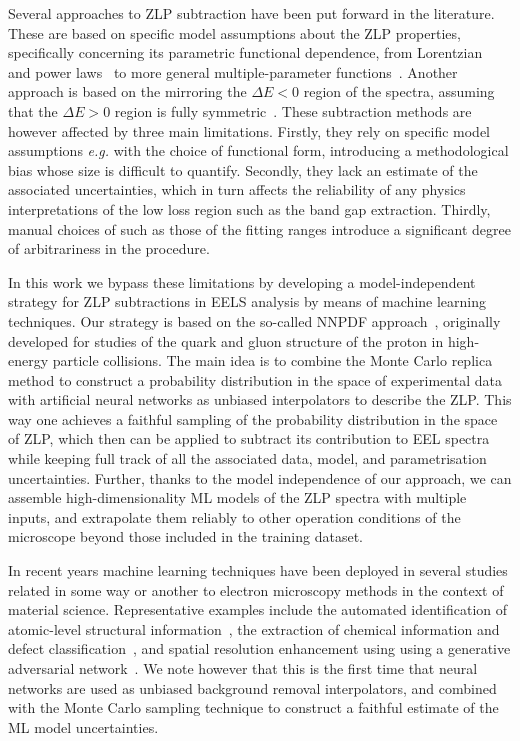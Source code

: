 Several approaches to ZLP subtraction have been put forward in the literature.
%
These are based on specific model assumptions about the ZLP properties, specifically
concerning its parametric functional dependence, from Lorentzian~\cite{Dorneich:1998}
and power laws~\cite{Erni:2005} to more general multiple-parameter functions~\cite{Benthem:2001}.
%
Another approach is based on the mirroring the $\Delta E <0$ region of the spectra, assuming
that the $\Delta E>0$ region is fully symmetric~\cite{Lazar:2003}.
%
These  subtraction methods are however affected by three main limitations.
%
Firstly, they rely on specific model assumptions {\it e.g.} with
the choice of functional form, introducing a methodological
bias whose size is difficult to quantify.
%
Secondly, they lack an estimate of the associated uncertainties, which in turn affects
the reliability of any physics interpretations of the low loss region such as the band gap extraction.
%
Thirdly, manual choices of such as those of the fitting ranges introduce a significant degree of
arbitrariness in the procedure.

In this work we bypass these limitations by developing a model-independent strategy
for ZLP subtractions in EELS analysis by means of machine learning techniques.
%
Our strategy is based on the so-called NNPDF approach~\cite{Ball:2008by,Ball:2012cx,Ball:2014uwa,Ball:2017nwa}, originally
developed for studies
of the quark and gluon structure of the proton in high-energy particle collisions.
%
The main idea is to combine the  Monte Carlo replica  method to construct a probability
distribution in the space of experimental data with artificial
neural networks as unbiased interpolators to describe the ZLP.
%
This way one achieves
a faithful sampling of the probability distribution in the space of ZLP,
which then can be applied to subtract its contribution to EEL spectra while keeping
full track of all the associated
data, model, and parametrisation uncertainties.
%
Further, thanks to the model independence
of our approach, we can assemble high-dimensionality ML models
of the ZLP spectra with multiple inputs, and extrapolate them reliably
to other operation conditions of the microscope beyond those included
in the training dataset.

In recent years
machine learning techniques have been deployed in several studies
related in some way or another to electron microscopy methods
in the context of material science.
%
Representative examples
include the automated identification
of atomic-level structural information~\cite{10.1145/2834892.2834896},
the extraction of chemical information
and defect classification~\cite{doi:10.1021/acsnano.7b07504},
and spatial resolution enhancement
using  using a generative adversarial network~\cite{cite-key}.
%
We note however that this is the first
time that neural networks are used as 
 unbiased
background removal interpolators, and combined with
the Monte Carlo sampling technique to construct a faithful estimate
of the ML model uncertainties.

